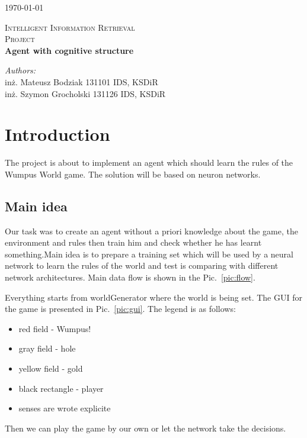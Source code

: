 \documentclass[a4paper]{article}
\begin{document}
\begin{flushright}
{\large \today}
\end{flushright}

\begin{center}



\textsc{\LARGE Intelligent Information Retrieval }\\[1.5cm]

\textsc{\Large Project }\\[0.5cm]

{ \huge \bfseries Agent with cognitive structure \\[0.4cm] }


\end{center}
\begin{minipage}{0.7\textwidth}
\begin{flushleft} \large
\emph{Authors:}\\
inż. Mateusz Bodziak 131101 IDS, KSDiR\\
inż. Szymon Grocholski 131126 IDS, KSDiR\\

\end{flushleft}
\end{minipage}

\section{Introduction}
The project is about to implement an agent which should learn the rules of the Wumpus World game. The solution will be based on neuron networks.
	
	\subsection{Main idea}
	Our task was to create an agent without a priori knowledge about the game, the 
	environment and rules then train him and check whether he has learnt something.Main idea is to prepare a training set which will be used by a neural network to learn
	 the rules of the world and test is comparing with different network architectures.
	 Main data flow is shown in the Pic.~\ref{pic:flow}. 
	 
	 Everything starts from worldGenerator where the world is being set. The GUI for the game is presented in Pic.~\ref{pic:gui}. The legend is as follows:
	 	\begin{itemize}
				\item red field - Wumpus!
				\item gray field - hole
				\item yellow field - gold
				\item black rectangle - player 
				\item senses are wrote explicite
			\end{itemize}
	 Then we can play the game by our own or let the network take the decisions. 
	 
\end{document}
